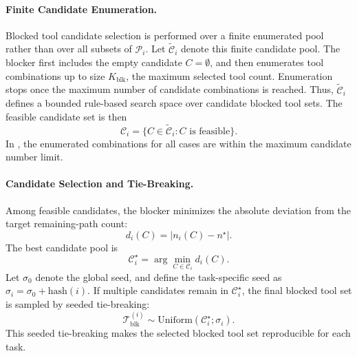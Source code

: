 \paragraph{Finite Candidate Enumeration.}
Blocked tool candidate selection is performed over a finite enumerated pool rather than over all subsets of $\mathcal{P}_i$.
Let $\widetilde{\mathcal{C}}_i$ denote this finite candidate pool.
The blocker first includes the empty candidate $C=\emptyset$, and then enumerates tool combinations up to size $K_{\mathrm{blk}}$, the maximum selected tool count.
Enumeration stops once the maximum number of candidate combinations is reached.
Thus, $\widetilde{\mathcal{C}}_i$ defines a bounded rule-based search space over candidate blocked tool sets.
The feasible candidate set is then
\begin{equation}
\mathcal{C}_i
=
\{C\in\widetilde{\mathcal{C}}_i: C \text{ is feasible}\}.
\end{equation}
In \bench{}, the enumerated combinations for all cases are within the maximum candidate number limit.

\paragraph{Candidate Selection and Tie-Breaking.}
Among feasible candidates, the blocker minimizes the absolute deviation from the target remaining-path count:
\begin{equation}
d_i(C)=|n_i(C)-n^\star|.
\end{equation}
The best candidate pool is
\begin{equation}
\mathcal{C}^{\star}_i
=
\arg\min_{C\in\mathcal{C}_i} d_i(C).
\end{equation}
Let $\sigma_0$ denote the global seed, and define the task-specific seed as $\sigma_i = \sigma_0 + \mathrm{hash}(i)$.
If multiple candidates remain in $\mathcal{C}^{\star}_i$, the final blocked tool set is sampled by seeded tie-breaking:
\begin{equation}
\mathcal{T}^{(i)}_{\mathrm{blk}}
\sim
\mathrm{Uniform}
\left(
\mathcal{C}^{\star}_i;
\sigma_i
\right).
\end{equation}
This seeded tie-breaking makes the selected blocked tool set reproducible for each task.

